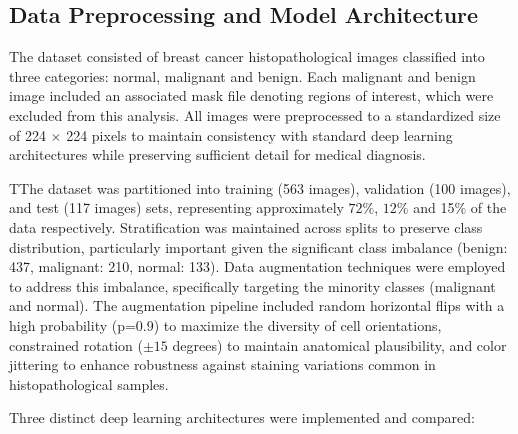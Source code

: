 \subsection{Data Preprocessing and Model Architecture}
The dataset consisted of breast cancer histopathological images classified into three categories: normal, malignant and benign. Each malignant and benign image included an associated mask file denoting regions of interest, which were excluded from this analysis. All images were preprocessed to a standardized size of 224 \( \times \) 224 pixels to maintain consistency with standard deep learning architectures while preserving sufficient detail for medical diagnosis.

TThe dataset was partitioned into training (563 images), validation (100 images), and test (117 images) sets, representing approximately $72\%$, $12\%$ and 15$\%$ of the data respectively. Stratification was maintained across splits to preserve class distribution, particularly important given the significant class imbalance (benign: 437, malignant: 210, normal: 133). Data augmentation techniques were employed to address this imbalance, specifically targeting the minority classes (malignant and normal). The augmentation pipeline included random horizontal flips with a high probability (p=0.9) to maximize the diversity of cell orientations, constrained rotation ($\pm15$ degrees) to maintain anatomical plausibility, and color jittering to enhance robustness against staining variations common in histopathological samples.

Three distinct deep learning architectures were implemented and compared:

